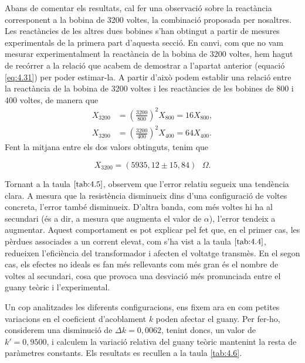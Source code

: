 \documentclass[a4paper,10.5pt]{report}
\begin{document}
Abans de comentar els resultats, cal fer una observació sobre la reactància corresponent a la bobina de 3200 voltes, la combinació proposada per nosaltres. Les reactàncies de les altres dues bobines s'han obtingut a partir de mesures experimentals de la primera part d'aquesta secció. En canvi, com que no vam mesurar experimentalment la reactància de la bobina de 3200 voltes, hem hagut de recórrer a la relació que acabem de demostrar a l'apartat anterior (equació \eqref{eq:4.31}) per poder estimar-la. A partir d'això podem establir una relació entre la reactància de la bobina de 3200 voltes i les reactàncies de les bobines de 800 i 400 voltes, de manera que
\begin{align*}
	X_{3200}  &= \left(\frac{3200}{800}\right)^2 X_{800} = 16 X_{800},  \\
	X_{3200}  &= \left(\frac{3200}{400}\right)^2 X_{400} = 64 X_{400}. 
\end{align*}
Fent la mitjana entre els dos valors obtinguts, tenim que 

\begin{equation*}
	X_{3200} = ( 5935,12 \pm 15,84)  \text{ $\Omega$}.
\end{equation*}


Tornant a la taula $\ref{tab:4.5}$, observem que l’error relatiu segueix una tendència clara. A mesura que la resistència disminueix dins d’una configuració de voltes concreta, l’error també disminueix. D’altra banda, com més voltes hi ha al secundari (és a dir, a mesura que augmenta el valor de $\alpha$), l’error tendeix a augmentar.
Aquest comportament es pot explicar pel fet que, en el primer cas, les pèrdues associades a un corrent elevat, com s’ha vist a la taula $\ref{tab:4.4}$, redueixen l’eficiència del transformador i afecten el voltatge transmès.
En el segon cas, els efectes no ideals es fan més rellevants com més gran és el nombre de voltes al secundari, cosa que provoca una desviació més pronunciada entre el guany teòric i l’experimental.

Un cop analitzades les diferents configuracions, ens fixem ara en com petites variacions en el coeficient d’acoblament $k$ poden afectar el guany. Per fer-ho, considerem una disminució de $\Delta k = 0{,}0062$, tenint doncs, un valor de $k' = 0,9500$, i calculem la variació relativa del guany teòric mantenint la resta de paràmetres constants. Els resultats es recullen a la taula \ref{tab:4.6}.
\end{document}
